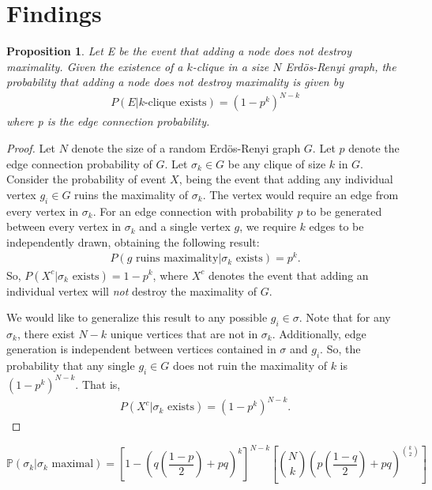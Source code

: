 \documentclass{article}
\newtheorem{prop}[thm]{Proposition}
\theoremstyle{definition}
\theoremstyle{remark}
\begin{document}
\section{Findings}
\label{sec:Findings}
\begin{prop}
    Let E be the event that adding a node does not destroy maximality. Given the existence of a $k$-clique in a size $N$ Erd{\"o}s-Renyi graph, the probability that adding a node does not destroy maximality is given by
    \begin{align}
        \label{eq:e of max clique}
        P(E|k\text{-clique exists}) = (1-p^k)^{N-k}
    \end{align}
    where p is the edge connection probability.
\end{prop}
\begin{proof}
    Let $N$ denote the size of a random Erd{\"o}s-Renyi graph $G$. Let $p$ denote the edge connection probability of $G$. Let $\sigma_k\in G$ be any clique of size $k$ in $G$. Consider the probability of event $X$, being the event that adding any individual vertex $g_i\in G$ ruins the maximality of $\sigma_k$. The vertex would require an edge from every vertex in $\sigma_k$. For an edge connection with probability $p$ to be generated between every vertex in $\sigma_k$ and a single vertex $g$, we require $k$ edges to be independently drawn, obtaining the following result:
    \begin{align}
        \label{eq:}
        P \left(g \text{ ruins maximality}|\sigma_k \text{ exists} \right) = p^k.
    \end{align}
    So, $P(X^c|\sigma_k \text{ exists}) = 1-p^k$, where $X^c$ denotes the event that adding an individual vertex will \textit{not} destroy the maximality of $G$.

    We would like to generalize this result to any possible $g_i\in\sigma$. Note that for any $\sigma_k$, there exist $N-k$ unique vertices that are not in $\sigma_k$. Additionally, edge generation is independent between vertices contained in $\sigma$ and $g_i$. So, the probability that any single $g_i\in G$ does not ruin the maximality of $k$ is $(1-p^k)^{N-k}$. That is,
    \begin{align}
        \label{eq:}
        P \left( X^c|\sigma_k \text{ exists} \right) = (1-p^k)^{N-k}.
    \end{align}
\end{proof}



\[
    \mathbb{P}(\sigma_k|\sigma_k\mbox{ maximal}) = \left[1-\left(q\left(\frac{1-p}{2}\right) +pq\right)^k\right]^{N-k} \left[\binom{N}{k}\left(p\left(\frac{1-q}{2}\right)+pq\right)^{\binom{k}{2}}\right]
\]
\end{document}
